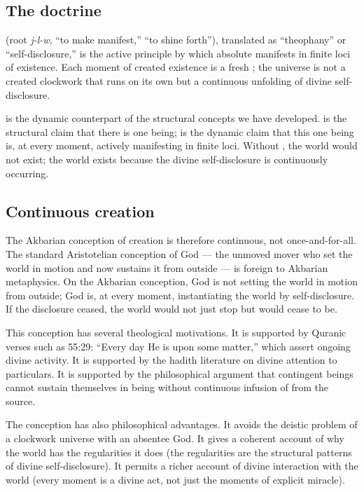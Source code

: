 \subsection{The doctrine}

\begin{definition}
\label{def:tajalli}
 (root \textit{j-l-w}, ``to make manifest,'' ``to
shine forth''), translated as ``theophany'' or ``self-disclosure,''
is the active principle by which absolute  manifests in
finite loci of existence. Each moment of created existence is a
fresh ; the universe is not a created clockwork that
runs on its own but a continuous unfolding of divine
self-disclosure.
\end{definition}

 is the dynamic counterpart of the structural concepts
we have developed.  is the structural claim
that there is one being;  is the dynamic claim that
this one being is, at every moment, actively manifesting in finite
loci. Without , the world would not exist; the world
exists because the divine self-disclosure is continuously occurring.

\subsection{Continuous creation}

The Akbarian conception of creation is therefore continuous, not
once-and-for-all. The standard Aristotelian conception of God ---
the unmoved mover who set the world in motion and now sustains it
from outside --- is foreign to Akbarian metaphysics. On the Akbarian
conception, God is not setting the world in motion from outside;
God is, at every moment, instantiating the world by self-disclosure.
If the disclosure ceased, the world would not just stop but would
cease to be.

This conception has several theological motivations. It is supported
by Quranic verses such as 55:29: ``Every day He is upon some
matter,'' which assert ongoing divine activity. It is supported by
the hadith literature on divine attention to particulars. It is
supported by the philosophical argument that contingent beings
cannot sustain themselves in being without continuous infusion of
 from the source.

The conception has also philosophical advantages. It avoids the
deistic problem of a clockwork universe with an absentee God. It
gives a coherent account of why the world has the regularities it
does (the regularities are the structural patterns of divine
self-disclosure). It permits a richer account of divine
interaction with the world (every moment is a divine act, not just
the moments of explicit miracle).

